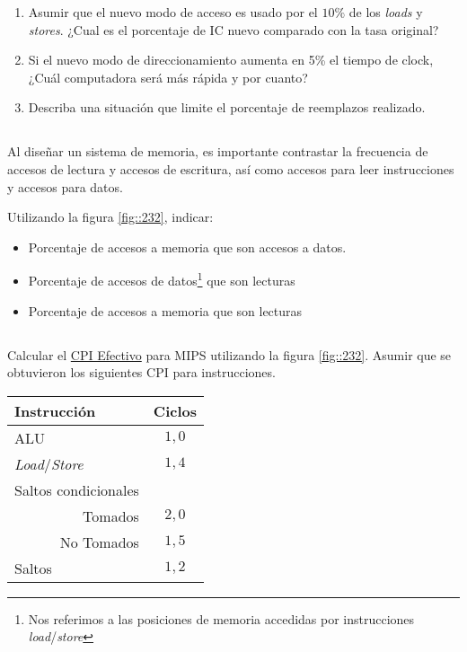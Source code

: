             \begin{enumerate}[label=\alph*)]
             \item Asumir que el nuevo modo de acceso es usado por el $10\%$ de los \textit{loads} y \textit{stores}. ¿Cual es el porcentaje de IC nuevo comparado con la tasa original?
            \item Si el nuevo modo de direccionamiento aumenta en 5\% el tiempo de clock, ¿Cuál
                   computadora será más rápida y por cuanto?
            \item Describa una situación que limite el porcentaje de reemplazos realizado.
            \end{enumerate}

\subsection {}
            Al diseñar un sistema de memoria, es importante contrastar la frecuencia de accesos de lectura y accesos de escritura, así como
            accesos para leer instrucciones y accesos para datos.

            Utilizando la figura \ref{fig::232}, indicar: %
            \begin{itemize}
            \item Porcentaje de accesos a memoria que son accesos a datos.
            \item Porcentaje de accesos de datos\footnote{Nos referimos a las posiciones de memoria accedidas por instrucciones \textit{load}/\textit{store}} que son lecturas  
            \item Porcentaje de accesos a memoria que son lecturas
            \end{itemize}

\subsection{}
            Calcular el \underline{CPI Efectivo} para MIPS utilizando la figura \ref{fig::232}. Asumir que se obtuvieron los siguientes CPI para instrucciones.

            \begin{center}
            \begin{tabular}{||l|c||}
            \hline
            Instrucción & Ciclos \\
            \hline
            ALU & $1,0$ \\\hline
            \textit{Load}/\textit{Store} & $1,4$ \\\hline
            Saltos condicionales & \\\hline
            \multicolumn{1}{||r|}{Tomados} & $2,0$ \\\hline
            \multicolumn{1}{||r|}{No Tomados} & $1,5$ \\\hline
            Saltos & $1,2$ \\\hline
            \end{tabular}
            \end{center}

